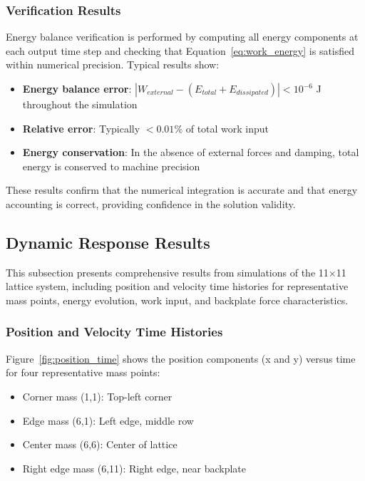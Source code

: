 \documentclass[11pt,a4paper]{article}
\begin{document}
\subsubsection{Verification Results}

\noindent Energy balance verification is performed by computing all energy components at each output time step and checking that Equation~\ref{eq:work_energy} is satisfied within numerical precision. Typical results show:

\begin{itemize}
    \item \textbf{Energy balance error}: $|W_{external} - (E_{total} + E_{dissipated})| < 10^{-6}$ J throughout the simulation
    \item \textbf{Relative error}: Typically $< 0.01\%$ of total work input
    \item \textbf{Energy conservation}: In the absence of external forces and damping, total energy is conserved to machine precision
\end{itemize}

\noindent These results confirm that the numerical integration is accurate and that energy accounting is correct, providing confidence in the solution validity.

\subsection{Dynamic Response Results}

\noindent This subsection presents comprehensive results from simulations of the 11×11 lattice system, including position and velocity time histories for representative mass points, energy evolution, work input, and backplate force characteristics.

\subsubsection{Position and Velocity Time Histories}

\noindent Figure~\ref{fig:position_time} shows the position components (x and y) versus time for four representative mass points:
\begin{itemize}
    \item Corner mass (1,1): Top-left corner
    \item Edge mass (6,1): Left edge, middle row
    \item Center mass (6,6): Center of lattice
    \item Right edge mass (6,11): Right edge, near backplate
\end{itemize}
\end{document}
